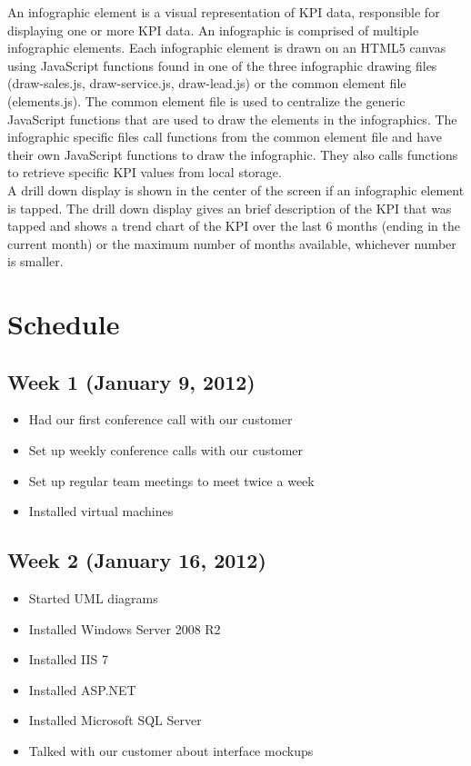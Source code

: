 \documentclass[11pt,a4paper,oneside]{article}
\begin{document}
An infographic element is a visual representation of KPI data, responsible for displaying one or more KPI data. An infographic is comprised of multiple infographic elements. Each infographic element is drawn on an HTML5 canvas using JavaScript functions found in one of the three infographic drawing files (draw-sales.js, draw-service.js, draw-lead.js) or the common element file (elements.js). The common element file is used to centralize the generic JavaScript functions that are used to draw the elements in the infographics. The infographic specific files call functions from the common element file and have their own JavaScript functions to draw the infographic. They also calls functions to retrieve specific KPI values from local storage.\\

A drill down display is shown in the center of the screen if an infographic element is tapped. The drill down display gives an brief description of the KPI that was tapped and shows a trend chart of the KPI over the last 6 months (ending in the current month) or the maximum number of months available, whichever number is smaller.\\


\section{Schedule}

\subsection{Week 1 (January 9, 2012)}
\begin{itemize}
\item Had our first conference call with our customer
\item Set up weekly conference calls with our customer
\item Set up regular team meetings to meet twice a week
\item Installed virtual machines
\end{itemize}


\subsection{Week 2 (January 16, 2012)}
\begin{itemize}
\item Started UML diagrams
\item Installed Windows Server 2008 R2
\item Installed IIS 7
\item Installed ASP.NET
\item Installed Microsoft SQL Server
\item Talked with our customer about interface mockups
\end{itemize}
\end{document}

